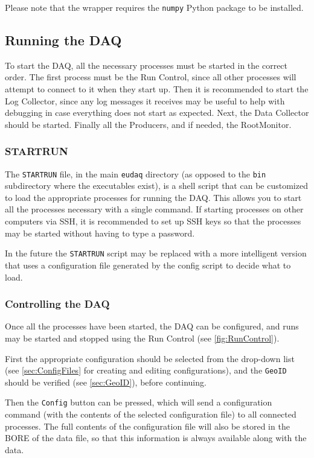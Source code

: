 Please note that the wrapper requires the \texttt{numpy} Python package to be
installed.


\subsection{Running the DAQ}
To start the DAQ, all the necessary processes must be started in the correct order.
The first process must be the Run Control,
since all other processes will attempt to connect to it when they start up.
Then it is recommended to start the Log Collector,
since any log messages it receives may be useful
to help with debugging in case everything does not start as expected.
Next, the Data Collector should be started.
Finally all the Producers, and if needed, the RootMonitor.

\subsubsection{STARTRUN}\label{sec:STARTRUN}
The \texttt{STARTRUN} file, in the main \texttt{eudaq} directory
(as opposed to the \texttt{bin} subdirectory where the executables exist),
is a shell script that can be customized to load the appropriate processes for running the DAQ.
This allows you to start all the processes necessary with a single command.
If starting processes on other computers via SSH,
it is recommended to set up SSH keys so that the processes may be started without having to type a password.

In the future the \texttt{STARTRUN} script may be replaced with a more intelligent version
that uses a configuration file generated by the config script to decide what to load.

\subsubsection{Controlling the DAQ}
Once all the processes have been started, the DAQ can be configured, and runs may be started and stopped
using the Run Control (see \autoref{fig:RunControl}).

First the appropriate configuration should be selected from the drop-down list
(see \autoref{sec:ConfigFiles} for creating and editing configurations),
and the \texttt{GeoID} should be verified (see \autoref{sec:GeoID}), before continuing.

Then the \texttt{Config} button can be pressed,
which will send a configuration command
(with the contents of the selected configuration file) to all connected processes.
The full contents of the configuration file will also be stored
in the \gls{BORE} of the data file,
so that this information is always available along with the data.

